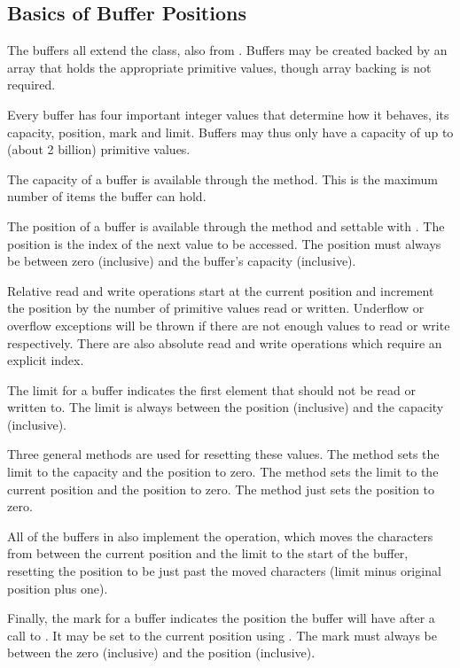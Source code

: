 \subsection{Basics of Buffer Positions}

The buffers all extend the  class, also from
.  Buffers may be created backed by an array that holds the appropriate
primitive values, though array backing is not required.

Every buffer has four important integer values that determine how it
behaves, its capacity, position, mark and limit.  Buffers may thus
only have a capacity of up to  (about 2
billion) primitive values.  

The capacity of a buffer is available through the 
method.  This is the maximum number of items the buffer can hold.

The position of a buffer is available through the 
method and settable with .  The position is the
index of the next value to be accessed.  The position must always
be between zero (inclusive) and the buffer's capacity (inclusive).

Relative read and write operations start at the current position and
increment the position by the number of primitive values read or
written.  Underflow or overflow exceptions will be thrown if there are
not enough values to read or write respectively.  There are also
absolute read and write operations which require an explicit index.

The limit for a buffer indicates the first element that should not be
read or written to.  The limit is always between the position (inclusive)
and the capacity (inclusive).

Three general methods are used for resetting these values.  The
 method sets the limit to the capacity and the position
to zero.  The  method sets the limit to the current
position and the position to zero.  The  method just
sets the position to zero.  

All of the buffers in  also implement the
 operation, which moves the characters from between
the current position and the limit to the start of the buffer,
resetting the position to be just past the moved characters (limit
minus original position plus one).

Finally, the mark for a buffer indicates the position the buffer will
have after a call to .  It may be set to the current
position using .  The mark must always be between the
zero (inclusive) and the position (inclusive).

